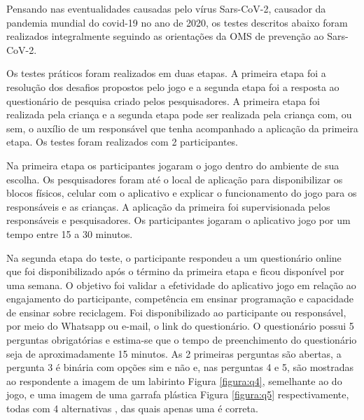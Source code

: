 Pensando nas eventualidades causadas pelo vírus Sars-CoV-2, causador da pandemia mundial do covid-19 no ano de 2020, os testes descritos abaixo foram realizados integralmente seguindo as orientações da OMS \cite{oms_2020} de prevenção ao Sars-CoV-2.

Os testes práticos foram realizados em duas etapas. A primeira etapa foi a resolução dos desafios propostos pelo jogo e a segunda etapa foi a resposta ao questionário de pesquisa criado pelos pesquisadores. A primeira etapa foi realizada pela criança e a segunda etapa pode ser realizada pela criança com, ou sem, o auxílio de um responsável que tenha acompanhado a aplicação da primeira etapa. Os testes foram realizados com 2 participantes.

Na primeira etapa os participantes jogaram o jogo dentro do ambiente de sua escolha. Os pesquisadores foram até o local de aplicação para disponibilizar os blocos físicos, celular com o aplicativo e explicar o funcionamento do jogo para os responsáveis e as crianças. A aplicação da primeira foi supervisionada pelos responsáveis e pesquisadores. Os participantes jogaram o  aplicativo jogo por um tempo entre 15 a 30 minutos.

Na segunda etapa do teste, o participante respondeu  a um questionário online que foi disponibilizado após o término da primeira etapa e ficou disponível por uma semana. O objetivo foi  validar a efetividade do aplicativo jogo em relação ao engajamento do participante, competência em ensinar programação e
capacidade de ensinar sobre reciclagem. Foi disponibilizado ao participante ou responsável, por meio do Whatsapp ou e-mail, o link do questionário. O questionário possui 5 perguntas obrigatórias e estima-se que o tempo de preenchimento do questionário seja de aproximadamente 15 minutos. As 2 primeiras perguntas são abertas, a pergunta 3 é binária com opções sim e não  e, nas perguntas 4 e 5, são mostradas ao respondente a imagem de um labirinto Figura \ref{figura:q4}, semelhante ao do jogo, e uma imagem de uma garrafa plástica Figura \ref{figura:q5} respectivamente, todas com 4 alternativas , das quais apenas uma é correta. 

